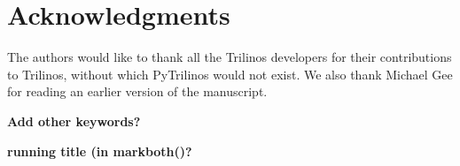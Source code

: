 \documentclass[acmtocl]{acmtrans2m}
\begin{document}
\bigskip

\section*{Acknowledgments}
\label{sec:acks}

The authors would like to thank all the Trilinos developers for their
contributions to Trilinos, without which PyTrilinos would not exist. We
also thank Michael Gee for reading an earlier version of the manuscript.

{\bf Add other keywords?}

{\bf running title (in markboth()?}



\end{document}
